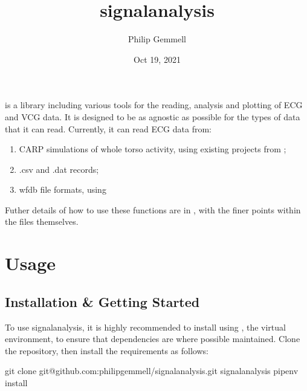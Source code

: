 \documentclass[letterpaper,10pt,english]{sphinxmanual}
\title{signalanalysis}
\date{Oct 19, 2021}
\author{Philip Gemmell}
\begin{document}
\pagestyle{empty}
\sphinxmaketitle
\pagestyle{plain}
\sphinxtableofcontents
\pagestyle{normal}
\label{\detokenize{index::doc}}


\sphinxAtStartPar
{} is a library including various tools for the reading, analysis and plotting of ECG and VCG data. It is designed to be as agnostic as possible for the types of data that it can read. Currently, it can read ECG data from:
\begin{enumerate}
%
\item {} 
\sphinxAtStartPar
CARP simulations of whole torso activity, using existing projects from ;

\item {} 
\sphinxAtStartPar
.csv and .dat records;

\item {} 
\sphinxAtStartPar
wfdb file formats, using 

\end{enumerate}

\sphinxAtStartPar
Futher details of how to use these functions are in {\hyperref[\detokenize{usage::doc}]{}}, with the finer points within the files themselves.


\chapter{Usage}
\label{\detokenize{usage:usage}}\label{\detokenize{usage::doc}}

\section{Installation \& Getting Started}
\label{\detokenize{usage:installation-getting-started}}\label{\detokenize{usage:installation}}
\sphinxAtStartPar
To use signalanalysis, it is highly recommended to install using , the virtual environment, to ensure that dependencies are where possible maintained. Clone the repository, then install the requirements as follows:

\begin{sphinxVerbatim}[commandchars=\\\{\}]
git clone git@github.com:philip\PYGZhy{}gemmell/signalanalysis.git
 signalanalysis
pipenv install
\end{sphinxVerbatim}
\end{document}
